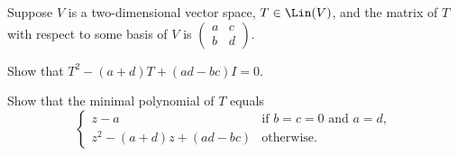 \begin{exercise}
Suppose $V$ is a two-dimensional vector space, $T\in\Lin(V)$, and the matrix
of $T$ with respect to some basis of $V$ is
$\begin{pmatrix} a & c\\ b & d \end{pmatrix}$.
\begin{parts}
\item Show that $T^2-(a+d)T+(ad-bc)I=0$.
\item Show that the minimal polynomial of $T$ equals
  \[ \begin{cases} z-a & \text{if } b=c=0 \text{ and } a=d,\\
     z^2-(a+d)z+(ad-bc) & \text{otherwise}. \end{cases} \]
\end{parts}
\end{exercise}

